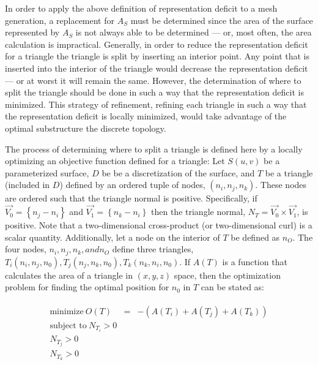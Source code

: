 \documentclass[11pt]{article}
\begin{document}
In order to apply the above definition of representation deficit to a
mesh generation, a replacement for $A_S$ must be determined since the
area of the surface represented by $A_S$ is not always able to be
determined --- or, most often, the area calculation is impractical.
Generally, in order to reduce the representation deficit for a triangle
the triangle is split by inserting an interior point. Any point that is
inserted into the interior of the triangle would decrease the
representation deficit --- or at worst it will remain the same. However,
the determination of where to split the triangle should be done in such
a way that the representation deficit is minimized. This strategy of
refinement, refining each triangle in such a way that the representation
deficit is locally minimized,  would take advantage of the optimal
substructure the discrete topology.

The process of determining where to split a triangle is defined here by
a locally optimizing an objective function defined for a triangle: Let
$S(u,v)$ be a parameterized surface, $D$ be be a discretization of the
surface, and $T$ be a triangle (included in $D$) defined by an ordered
tuple of nodes, $\left(n_i, n_j, n_k\right)$. These nodes are ordered
such that the triangle normal is positive. Specifically, if $\vec{V_0} =
\left\{n_j - n_i \right\}$ and $\vec{V_1} = \left\{n_k - n_i\right\}$
then the triangle normal, $N_T = \vec{V_0} \times \vec{V_1}$, is
positive. Note that a two-dimensional cross-product (or two-dimensional
curl) is a scalar quantity. Additionally, let a node on the interior of
$T$ be defined as $n_O$. The four nodes, $n_i, n_j, n_k, and n_O$ define
three triangles, $T_i\left(n_i,n_j,n_0\right), T_j\left(n_j, n_k,
n_0\right), T_k\left(n_k, n_i, n_0\right)$. If $A(T)$ is a function that
calculates the area of a triangle in $\left(x,y,z\right)$ space, then
the optimization problem for finding the optimal position for $n_0$ in
$T$ can be stated as:

\begin{eqnarray*}
\begin{array}{rcl}
\text{minimize} \ O(T) & = & -\left(A\left(T_i\right) + A\left(T_j\right) + A\left(T_k\right) \right) \\
\text{subject to} \ N_{T_i} > 0 \\
N_{T_j} > 0 \\ 
N_{T_k} > 0 \\
\end{array}
\end{eqnarray*}
\end{document}
